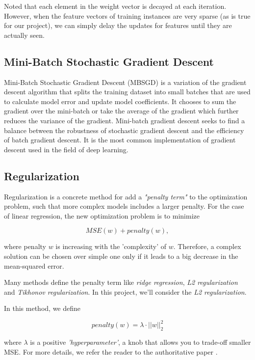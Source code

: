 \documentclass[sigconf]{acmart}
\begin{document}
Noted that each element in the weight vector is decayed at each iteration. However, when the feature vectors of training instances are very sparse (as is true for our project), we can simply delay the updates for features until they are actually seen. 

\subsection{Mini-Batch Stochastic Gradient Descent}
\label{subsection:logisticMBSGD}

Mini-Batch Stochastic Gradient Descent (MBSGD) \cite{ioffe2015batch} is a variation of the gradient descent algorithm that splits the training dataset into small batches that are used to calculate model error and update model coefficients. It chooses to sum the gradient over the mini-batch or take the average of the gradient which further reduces the variance of the gradient. Mini-batch gradient descent seeks to find a balance between the robustness of stochastic gradient descent and the efficiency of batch gradient descent. It is the most common implementation of gradient descent used in the field of deep learning.

\subsection{Regularization}
\label{subsection:regularization}

Regularization is a concrete method for add a \textit{"penalty term"} to the optimization problem, such that more complex models includes a larger penalty. For the case of linear regression, the new optimization problem is to minimize

$$
MSE(w) + penalty(w),
$$

where penalty $w$ is increasing with the 'complexity' of $w$. Therefore, a complex solution can be chosen over simple one only if it leads to a big decrease in the mean-squared error.

Many methods define the penalty term like \textit{ridge regression}, \textit{L2 regularization} and \textit{Tikhonov regularization}. In this project, we'll consider the \textit{ L2 regularization}.

In this method, we define

$$
penalty(w) = \lambda \cdot ||w||^2_2
$$

where $\lambda$ is a positive \textit{'hyperparameter'}, a knob that allows you to trade-off smaller MSE. For more details, we refer the reader to the authoritative paper \cite{nasrabadi2007pattern}. 
\end{document}

